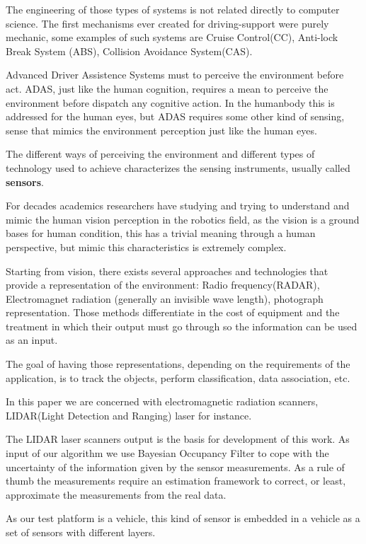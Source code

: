 The engineering of those types of systems is not related directly to computer science. The first mechanisms ever created for driving-support were purely mechanic, some examples of such systems are Cruise Control(CC), Anti-lock Break System (ABS), Collision Avoidance System(CAS).

Advanced Driver Assistence Systems must to perceive the environment before act. ADAS, just like the human cognition, requires a mean to perceive the environment before dispatch any cognitive action. In the humanbody this is addressed for the human eyes, but ADAS requires some other kind of sensing, sense that mimics the environment perception just like the human eyes. 

The different ways of perceiving the environment and different types of technology used to achieve characterizes the sensing instruments, usually called \textbf{sensors}.


For decades academics researchers have studying and trying to understand and mimic the human vision perception in the robotics field, as the vision is a ground bases for human condition, this has a trivial meaning through a human perspective, but mimic this characteristics is extremely complex.

Starting from vision, there exists several approaches and technologies that provide a representation of the environment: Radio frequency(RADAR), Electromagnet radiation (generally an invisible wave length), photograph representation. Those methods differentiate in the cost of equipment and the treatment in which their output must go through so the information can be used as an input.

The goal of having those representations, depending on the requirements of the application, is to track the objects, perform classification, data association, etc.

In this paper we are concerned with electromagnetic radiation scanners, LIDAR(Light Detection and Ranging) laser for instance.

The LIDAR laser scanners output is the basis for development of this work. As input of our algorithm we use Bayesian Occupancy Filter \cite{TAY-2008-295084} to cope with the uncertainty of the information given by the sensor measurements. As a rule of thumb the measurements require an estimation framework to correct, or least, approximate the measurements from the real data.

As our test platform is a vehicle, this kind of sensor is embedded in a vehicle as a set of sensors with different layers.

